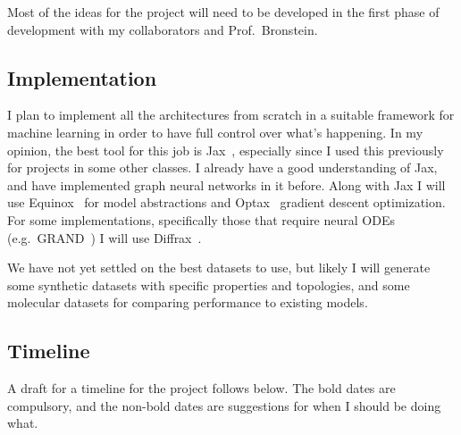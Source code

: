 \documentclass[11pt]{article}
\begin{document}
    Most of the ideas for the project will need to be developed in the first phase of development with my collaborators and Prof.\ Bronstein.

    \subsection*{Implementation}
    I plan to implement all the architectures from scratch in a suitable framework for machine learning in order to have full control over what's happening.
    In my opinion, the best tool for this job is Jax~\cite{jax2018github}, especially since I used this previously for projects in some other classes.
    I already have a good understanding of Jax, and have implemented graph neural networks in it before.
    Along with Jax I will use Equinox~\cite{kidger2021equinox} for model abstractions and Optax~\cite{optax2020github} gradient descent optimization.
    For some implementations, specifically those that require neural ODEs (e.g.\ GRAND~\cite{chamberlainGRANDGraphNeural2021}) I will use Diffrax~\cite{kidgerNeuralDifferentialEquations2022}.

    We have not yet settled on the best datasets to use, but likely I will generate some synthetic datasets with specific properties and topologies, and some molecular datasets for comparing performance to existing models.

    \subsection*{Timeline}
    A draft for a timeline for the project follows below.
    The bold dates are compulsory, and the non-bold dates are suggestions for when I should be doing what.
    
\end{document}
